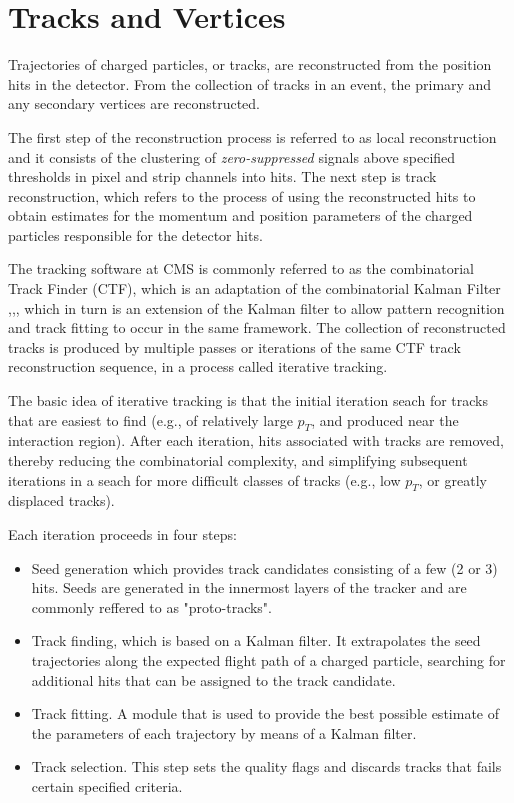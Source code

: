 \section{Tracks and Vertices}
\label{sec:track}

 Trajectories of charged particles, or tracks, are reconstructed from the position hits in the detector. From the collection of tracks in an event, the primary and any secondary vertices are reconstructed.

 The first step of the reconstruction process is referred to as local reconstruction and it consists of the clustering of \textit{zero-suppressed} signals above specified thresholds in pixel and strip channels into hits. The next step is track reconstruction, which refers to the process of using the reconstructed hits to obtain estimates for the momentum and position parameters of the charged particles responsible for the detector hits. 

 The tracking software at CMS\cite{TRK-11-001} is commonly referred to as the combinatorial Track Finder (CTF), which is an adaptation of the combinatorial Kalman Filter \cite{Billoir:1989mh},\cite{BILLOIR1990219},\cite{Mankel:1997dy}, which in turn is an extension of the Kalman filter\cite{Fruhwirth:1987fm} to allow pattern recognition and track fitting to occur in the same framework. The collection of reconstructed tracks is produced by multiple passes or iterations of the same CTF track reconstruction sequence, in a process called iterative tracking. 

The basic idea of iterative tracking is that the initial iteration seach for tracks that are easiest to find (e.g., of relatively large $p_{T}$, and produced near the interaction region). After each iteration, hits associated with tracks are removed, thereby reducing the combinatorial complexity, and simplifying subsequent iterations in a seach for more difficult classes of tracks (e.g., low $p_{T}$, or greatly displaced tracks).

Each iteration proceeds in four steps:

\begin{itemize}
	\item Seed generation which provides track candidates consisting of a few (2 or 3) hits. Seeds are generated in the innermost layers of the tracker and are commonly reffered to as "proto-tracks".
	\item Track finding, which is based on a Kalman filter. It extrapolates the seed trajectories along the expected flight path of a charged particle, searching for additional hits that can be assigned to the track candidate.
	\item Track fitting. A module that is used to provide the best possible estimate of the parameters of each trajectory by means of a Kalman filter.
	\item Track selection. This step sets the quality flags and discards tracks that fails certain specified criteria.
\end{itemize}

